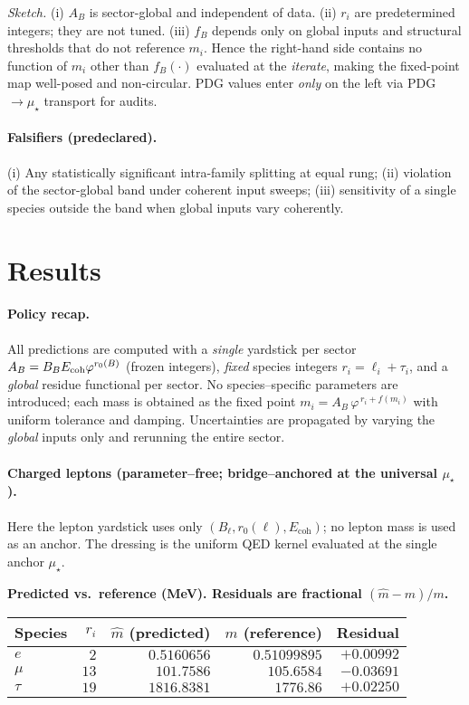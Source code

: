 \documentclass[epjc3]{svjour3}
\begin{document}
\emph{Sketch.} (i) $A_B$ is sector-global and independent of data. (ii) $r_i$ are predetermined integers; they are not tuned. (iii) $f_B$ depends only on global inputs and structural thresholds that do not reference $m_i$. Hence the right-hand side contains no function of $m_i$ other than $f_B(\cdot)$ evaluated at the \emph{iterate}, making the fixed-point map well-posed and non-circular. PDG values enter \emph{only} on the left via PDG$\to\mu_\star$ transport for audits.

\paragraph{Falsifiers (predeclared).}
(i) Any statistically significant intra-family splitting at equal rung; (ii) violation of the sector-global band under coherent input sweeps; (iii) sensitivity of a single species outside the band when global inputs vary coherently.

\section{Results}

\paragraph{Policy recap.}
All predictions are computed with a \emph{single} yardstick per sector $A_B=B_B E_{\rm coh}\varphi^{r_0(B)}$ (frozen integers), \emph{fixed} species integers $r_i=\ell_i+\tau_i$, and a \emph{global} residue functional per sector. No species–specific parameters are introduced; each mass is obtained as the fixed point $m_i=A_B\,\varphi^{\,r_i+f(m_i)}$ with uniform tolerance and damping. Uncertainties are propagated by varying the \emph{global} inputs only and rerunning the entire sector.

\paragraph{Charged leptons (parameter–free; bridge–anchored at the universal $\mu_\star$).}
Here the lepton yardstick uses only $(B_\ell,r_0(\ell),E_{\mathrm{coh}})$; no lepton mass is used as an anchor. The dressing is the uniform QED kernel evaluated at the single anchor $\mu_\star$.

\medskip
\noindent\textbf{Predicted vs.\ reference (MeV). Residuals are fractional $(\widehat m - m)/m$.}
\begin{center}
\begin{tabular}{lrrrr}
\toprule
Species & $r_i$ & $\widehat m$ (predicted) & $m$ (reference) & Residual \\
\midrule
$e$   & $2$  & $0.5160656$  & $0.51099895$ & $+0.00992$ \\
$\mu$ & $13$ & $101.7586$   & $105.6584$   & $-0.03691$ \\
$\tau$& $19$ & $1816.8381$  & $1776.86$    & $+0.02250$ \\
\bottomrule
\end{tabular}
\end{center}
\end{document}
